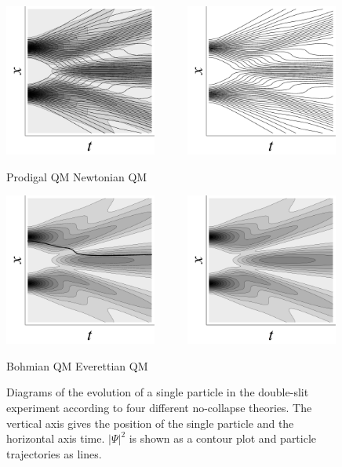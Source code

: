 \documentclass[12pt,secnumarabic,balancelastpage,amsmath,amssymb,nofootinbib]{article}
\begin{document}
\begin{figure}[t]
\centerline{\includegraphics[width=5cm]{ProdigalQMBlackandWhite.jpg}\ \ \ \ \ \ \includegraphics[width=5cm]{NewtonianQMBlackandWhite.jpg}}
\vspace*{-4 pt}
\large{\hspace*{2.5 cm} Prodigal QM \hspace{2.5 cm} Newtonian QM}\vspace*{8 pt}\\
\centerline{\includegraphics[width=5cm]{BohmianQMBlackandWhite.jpg}\ \ \ \ \ \ \includegraphics[width=5cm]{EverettianQMBlackandWhite.jpg}}\vspace*{-4 pt}
\large{\hspace*{2.5 cm} Bohmian QM \hspace{2.5 cm} Everettian QM}
\caption{Diagrams of the evolution of a single particle in the double-slit experiment according to four different no-collapse theories.  The vertical axis gives the position of the single particle and the horizontal axis time.  $|\Psi|^2$ is shown as a contour plot and particle trajectories as lines.}
\label{NoCollapseQMs}
\end{figure}
\end{document}
